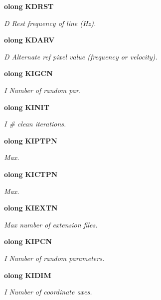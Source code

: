 \begin{CompactItemize}
{\bf olong} {\bf KDRST}
\begin{CompactList}\small\item\em D Rest frequency of line (Hz). \item\end{CompactList}\item 
{\bf olong} {\bf KDARV}
\begin{CompactList}\small\item\em D Alternate ref pixel value (frequency or velocity). \item\end{CompactList}\item 
{\bf olong} {\bf KIGCN}
\begin{CompactList}\small\item\em I Number of random par. \item\end{CompactList}\item 
{\bf olong} {\bf KINIT}
\begin{CompactList}\small\item\em I \# clean iterations. \item\end{CompactList}\item 
{\bf olong} {\bf KIPTPN}
\begin{CompactList}\small\item\em Max. \item\end{CompactList}\item 
{\bf olong} {\bf KICTPN}
\begin{CompactList}\small\item\em Max. \item\end{CompactList}\item 
{\bf olong} {\bf KIEXTN}
\begin{CompactList}\small\item\em Max number of extension files. \item\end{CompactList}\item 
{\bf olong} {\bf KIPCN}
\begin{CompactList}\small\item\em I Number of random parameters. \item\end{CompactList}\item 
{\bf olong} {\bf KIDIM}
\begin{CompactList}\small\item\em I Number of coordinate axes. \item\end{CompactList}\item 

\end{CompactItemize}
